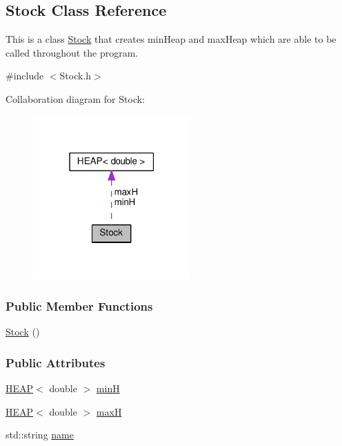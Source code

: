 \hypertarget{classStock}{\subsection{Stock Class Reference}
\label{classStock}
}


This is a class \hyperlink{classStock}{Stock} that creates min\+Heap and max\+Heap which are able to be called throughout the program.  




{\ttfamily \#include $<$Stock.\+h$>$}



Collaboration diagram for Stock\+:\nopagebreak
\begin{figure}[H]
\begin{center}
\leavevmode
\includegraphics[width=171pt]{classStock__coll__graph}
\end{center}
\end{figure}
\subsubsection*{Public Member Functions}
\begin{DoxyCompactItemize}
\item 
\hyperlink{classStock_adddc4282213b3174a4299cca5a30117c}{Stock} ()
\end{DoxyCompactItemize}
\subsubsection*{Public Attributes}
\begin{DoxyCompactItemize}
\item 
\hyperlink{classHEAP}{H\+E\+A\+P}$<$ double $>$ \hyperlink{classStock_ab3a0f86a08ac6fa8dac1e9a1a855d0df}{min\+H}
\item 
\hyperlink{classHEAP}{H\+E\+A\+P}$<$ double $>$ \hyperlink{classStock_a00ba093f5066735943fc4651f17905fe}{max\+H}
\item 
std\+::string \hyperlink{classStock_a8b79c44538a5f8845a17e537798719e4}{name}
\end{DoxyCompactItemize}



